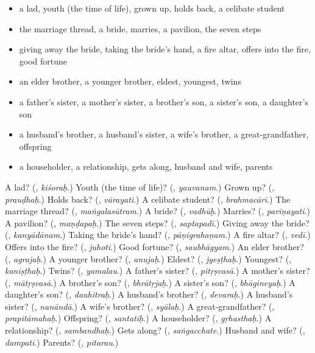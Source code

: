 \begin{itemize}
\raggedright
  \item a lad, youth (the time of life), grown up, holds back, a celibate student
  \item the marriage thread, a bride, marries, a pavilion, the seven steps
  \item giving away the bride, taking the bride's hand, a fire altar, offers into the fire, good fortune
  \item an elder brother, a younger brother, eldest, youngest, twins
  \item a father's sister, a mother's sister, a brother's son, a sister's son, a daughter's son
  \item a husband's brother, a husband's sister, a wife's brother, a great-grandfather, offspring
  \item a householder, a relationship, gets along, husband and wife, parents
\end{itemize}

\begin{tcolorbox}[breakable,colback=teal!4,colframe=teal!35!black,title={Before you move on}]
A lad? (\textbf{}, \emph{kiśoraḥ}.) Youth (the time of life)? (\textbf{}, \emph{yauvanam}.) Grown up? (\textbf{}, \emph{prauḍhaḥ}.) Holds back? (\textbf{}, \emph{vārayati}.) A celibate student? (\textbf{}, \emph{brahmacārī}.) The marriage thread? (\textbf{}, \emph{maṅgalasūtram}.) A bride? (\textbf{}, \emph{vadhūḥ}.) Marries? (\textbf{}, \emph{pariṇayati}.) A pavilion? (\textbf{}, \emph{maṇḍapaḥ}.) The seven steps? (\textbf{}, \emph{saptapadī}.) Giving away the bride? (\textbf{}, \emph{kanyādānam}.) Taking the bride's hand? (\textbf{}, \emph{pāṇigrahaṇam}.) A fire altar? (\textbf{}, \emph{vedī}.) Offers into the fire? (\textbf{}, \emph{juhoti}.) Good fortune? (\textbf{}, \emph{saubhāgyam}.) An elder brother? (\textbf{}, \emph{agrajaḥ}.) A younger brother? (\textbf{}, \emph{anujaḥ}.) Eldest? (\textbf{}, \emph{jyeṣṭhaḥ}.) Youngest? (\textbf{}, \emph{kaniṣṭhaḥ}.) Twins? (\textbf{}, \emph{yamalau}.) A father's sister? (\textbf{}, \emph{pitṛṣvasā}.) A mother's sister? (\textbf{}, \emph{mātṛṣvasā}.) A brother's son? (\textbf{}, \emph{bhrātṛjaḥ}.) A sister's son? (\textbf{}, \emph{bhāgineyaḥ}.) A daughter's son? (\textbf{}, \emph{dauhitraḥ}.) A husband's brother? (\textbf{}, \emph{devaraḥ}.) A husband's sister? (\textbf{}, \emph{nanāndā}.) A wife's brother? (\textbf{}, \emph{syālaḥ}.) A great-grandfather? (\textbf{}, \emph{prapitāmahaḥ}.) Offspring? (\textbf{}, \emph{santatiḥ}.) A householder? (\textbf{}, \emph{gṛhasthaḥ}.) A relationship? (\textbf{}, \emph{sambandhaḥ}.) Gets along? (\textbf{}, \emph{saṅgacchate}.) Husband and wife? (\textbf{}, \emph{dampatī}.) Parents? (\textbf{}, \emph{pitarau}.)
\end{tcolorbox}
